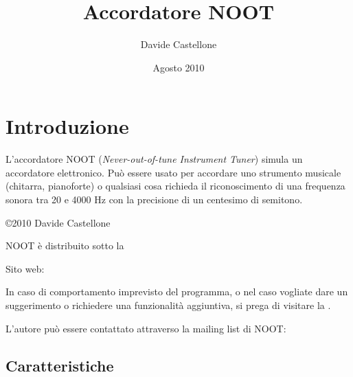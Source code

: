 \newcommand{\noun}[1]{\textsc{#1}}

\makeindex


\author{Davide Castellone}
\title{Accordatore NOOT}
\date{Agosto 2010}
\maketitle
\tableofcontents

\pagestyle{fancyplain}%

\chapter{Introduzione}\label{introduction}

L'accordatore \noun{NOOT} (\textit{Never-out-of-tune Instrument Tuner}) simula un
accordatore elettronico. Può essere usato per accordare uno strumento musicale
(chitarra, pianoforte) o qualsiasi cosa richieda il riconoscimento di
una frequenza sonora tra 20 e 4000 Hz con la precisione di un centesimo di semitono.

\copyright 2010 Davide Castellone

\noun{NOOT} è distribuito sotto la


Sito web: 

In caso di comportamento imprevisto del programma, o nel caso vogliate dare un suggerimento
o richiedere una funzionalità aggiuntiva, si prega di visitare la 
.

L'autore può essere contattato attraverso la mailing list di NOOT: 

\section{Caratteristiche}\label{features}

